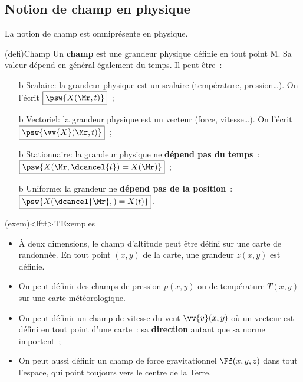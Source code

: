 \documentclass[../../main/main.tex]{subfiles}
\begin{document}
\subsection{Notion de champ en physique}
La notion de champ est omniprésente en physique.
\begin{tcb}(defi){Champ}
	Un \textbf{champ} est une grandeur physique définie en tout point M. Sa
	valeur dépend en général également du temps. Il peut être~:
	\begin{itemize}
		\setlength{\fboxsep}{3mm}
		\item[b]{Scalaire}: la grandeur physique est un scalaire (température,
		pression…). On l'écrit $\boxed{\psw{X (\Mr,t)}}$~;
		\item[b]{Vectoriel}: la grandeur physique est un vecteur (force,
		vitesse…). On l'écrit $\boxed{\psw{\vv{X}(\Mr,t)}}$~;
		\item[b]{Stationnaire}: la grandeur physique ne \textbf{dépend pas du
			temps}~: $\boxed{\psw{X (\Mr,\dcancel{t}) = X(\Mr)}}$~;
		\item[b]{Uniforme}: la grandeur ne \textbf{dépend pas de la position}~:
		$\boxed{\psw{X (\dcancel{\Mr},) = X(t)}}$.
	\end{itemize}
\end{tcb}
\begin{tcb}(exem)<lftt>'l'{Exemples}
	\begin{itemize}
		\item À deux dimensions, le champ d'altitude peut être défini sur une carte
		      de randonnée. En tout point $(x,y)$ de la carte, une grandeur $z(x,y)$ est
		      définie.
		\item On peut définir des champs de pression $p (x,y)$ ou de température
		      $T (x,y)$ sur une carte météorologique.
		\item On peut définir un champ de vitesse du vent $\vv{v}(x,y)$ où un vecteur
		      est défini en tout point d'une carte~: sa \textbf{direction} autant que sa
		      norme importent~;
		\item On peut aussi définir un champ de force gravitationnel $\Ff (x,y,z)$
		      dans tout l'espace, qui point toujours vers le centre de la Terre.
	\end{itemize}
\end{tcb}
\end{document}

